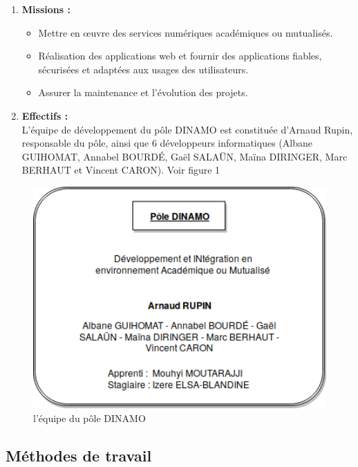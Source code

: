 \documentclass[12pt]{article}
\begin{document}
\begin{enumerate}
\item \textbf{Missions :}\\

\begin{itemize}
\item Mettre en œuvre des services numériques académiques ou mutualisés.
\item Réalisation des applications web et fournir des applications fiables, sécurisées et adaptées aux usages des utilisateurs. 
\item Assurer la maintenance et l'évolution des projets.\\
\end{itemize}

\item \textbf{Effectifs :}\\
L’équipe de développement du pôle DINAMO est constituée d’Arnaud Rupin, responsable du pôle, ainsi que 6 développeurs informatiques (Albane GUIHOMAT, Annabel BOURDÉ, Gaël SALAÜN, Maïna DIRINGER, Marc BERHAUT et Vincent CARON). Voir figure 1\\

\end{enumerate}

\begin{figure}[H]
	\centering
 		\includegraphics[width=1\textwidth]{diagrammes/PoleDinamo.png}
  		\caption{l'équipe du pôle DINAMO}
	\end{figure}


\subsection{Méthodes de travail}
\end{document}

